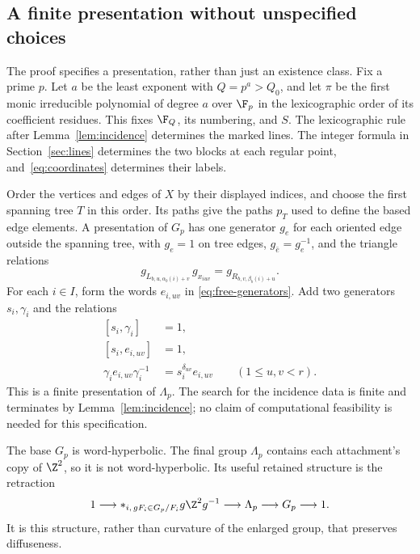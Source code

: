 \subsection{A finite presentation without unspecified choices}

The proof specifies a presentation, rather than just an existence
class. Fix a prime \(p\). Let \(a\) be the least exponent with
\(Q=p^a>Q_0\), and let \(\pi\) be the first monic irreducible
polynomial of degree \(a\) over \(\F_p\) in the lexicographic order
of its coefficient residues. This fixes \(\F_Q\), its numbering, and
\(S\). The lexicographic rule after
Lemma~\ref{lem:incidence} determines the marked lines. The integer
formula in Section~\ref{sec:lines} determines the two blocks at each
regular point, and~\eqref{eq:coordinates} determines their labels.

Order the vertices and edges of \(X\) by their displayed indices,
and choose the first spanning tree \(T\) in this order. Its paths
give the paths \(p_T\) used to define the based edge elements.
A presentation of \(G_p\) has one generator \(g_e\) for each oriented
edge outside the spanning tree, with \(g_e=1\) on tree edges,
\(g_{\bar e}=g_e^{-1}\), and the triangle relations
\[
 g_{L_{b,u,\alpha_b(i)+v}}\,g_{x_{iuv}}
 =g_{R_{b,v,\beta_b(i)+u}}.
\]
For each \(i\in I\), form the words \(e_{i,uv}\) in
\eqref{eq:free-generators}. Add two generators \(s_i,\gamma_i\) and
the relations
\begin{equation}\label{eq:final-presentation}
 \begin{aligned}
 [s_i,\gamma_i]&=1,\\
 [s_i,e_{i,uv}]&=1,\\
 \gamma_i e_{i,uv}\gamma_i^{-1}
 &=s_i^{\delta_{uv}}e_{i,uv}
 \qquad(1\le u,v<r).
 \end{aligned}
\end{equation}
This is a finite presentation of \(\Lambda_p\).
The search for the incidence data is finite and terminates by
Lemma~\ref{lem:incidence}; no claim of computational feasibility is
needed for this specification.

The base \(G_p\) is word-hyperbolic. The final group \(\Lambda_p\)
contains each attachment's copy of \(\Z^2\), so it is not
word-hyperbolic. Its useful retained structure is the retraction
\[
 1\longrightarrow
 *_{i,\,gF_i\in G_p/F_i}g\Z^2g^{-1}
 \longrightarrow\Lambda_p\longrightarrow G_p\longrightarrow1.
\]
It is this structure, rather than curvature of the enlarged group,
that preserves diffuseness.

